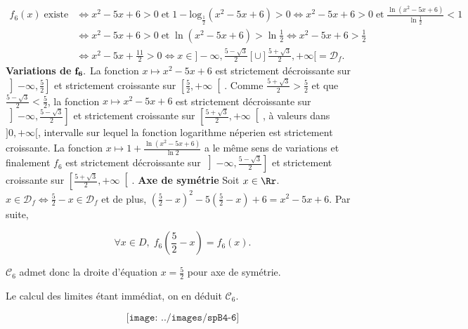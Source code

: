 {\begin{enumerate}
{\begin{align*}
f_6(x)\;\mbox{existe}&\Leftrightarrow x^2-5x+6>0\;\mbox{et}\;1-\mbox{log}_{\frac{1}{2}}(x^2-5x+6)>0
\Leftrightarrow x^2-5x+6>0\;\mbox{et}\;\frac{\ln(x^2-5x+6)}{\ln\frac{1}{2}}<1\\
 &\Leftrightarrow x^2-5x+6>0\;\mbox{et}\;\ln(x^2-5x+6)>\ln\frac{1}{2}\Leftrightarrow x^2-5x+6>\frac{1}{2}\\
 &\Leftrightarrow x^2-5x+\frac{11}{2}>0\Leftrightarrow x\in]-\infty,\frac{5-\sqrt{3}}{2}[\cup]\frac{5+\sqrt{3}}{2},+\infty[=\mathcal{D}_f.
\end{align*}
\textbf{Variations de} $\bf{f_6.}$ La fonction $x\mapsto x^2-5x+6$ est strictement décroissante sur
$\left]-\infty,\frac{5}{2}\right]$ et strictement croissante sur $\left[\frac{5}{2},+\infty\right[$. Comme
$\frac{5+\sqrt{3}}{2}>\frac{5}{2}$ et que $\frac{5-\sqrt{3}}{2}<\frac{5}{2}$, la fonction $x\mapsto x^2-5x+6$ est
strictement décroissante sur$\left]-\infty,\frac{5-\sqrt{3}}{2}\right]$ et strictement croissante sur
$\left[\frac{5+\sqrt{3}}{2},+\infty\right[$, à valeurs dans $]0,+\infty[$, intervalle sur lequel la fonction logarithme néperien
est strictement croissante. La fonction $x\mapsto1+\frac{\ln(x^2-5x+6)}{\ln2}$ a le même sens de variations et
finalement $f_6$ est strictement décroissante sur $\left]-\infty,\frac{5-\sqrt{3}}{2}\right]$ et strictement croissante
sur $\left[\frac{5+\sqrt{3}}{2},+\infty\right[$.
\textbf{Axe de symétrie} Soit $x\in\Rr$. $x\in\mathcal{D}_f\Leftrightarrow\frac{5}{2}-x\in\mathcal{D}_f$ et de 
plus, $\left(\frac{5}{2}-x\right)^2-5\left(\frac{5}{2}-x\right)+6=x^2-5x+6$. Par suite,

$$\forall x\in D,\;f_6(\frac{5}{2}-x)=f_6(x).$$

$\mathcal{C}_6$ admet donc la droite d'équation $x=\frac{5}{2}$ pour axe de symétrie.

Le calcul des limites étant immédiat, on en déduit $\mathcal{C}_6$.

$$\texttt{[image: ../images/spB4-6]}$$}
\end{enumerate}
}
